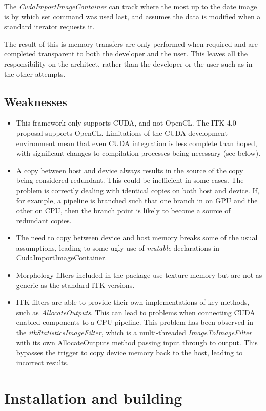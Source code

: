 \documentclass{InsightArticle}
\begin{document}
The {\em CudaImportImageContainer} can track where the most up to the
date image is by which set command was used last, and assumes the data
is modified when a standard iterator requests it.

The result of this is memory transfers are only performed when
required and are completed transparent to both the developer and the
user. This leaves all the responsibility on the architect, rather than
the developer or the user such as in the other attempts.

\subsection{Weaknesses}
\begin{itemize}
\item This framework only supports CUDA, and not OpenCL. The ITK 4.0
proposal supports OpenCL. Limitations of the CUDA development
environment mean that even CUDA integration is less complete than
hoped, with significant changes to compilation processes being
necessary (see below).
\item A copy between host and device always results in the source of
the copy being considered redundant. This could be inefficient in some
cases. The problem is correctly dealing with identical copies on both
host and device. If, for example, a pipeline is branched such that one
branch in on GPU and the other on CPU, then the branch point is likely
to become a source of redundant copies.
\item The need to copy between device and host memory breaks some of
the usual assumptions, leading to some ugly use of {\em mutable}
declarations in CudaImportImageContainer.
\item Morphology filters included in the package use texture memory
but are not as generic as the standard ITK versions.
\item ITK filters are able to provide their own implementations of key
methods, such as {\em AllocateOutputs}. This can lead to problems when
connecting CUDA enabled components to a CPU pipeline. This problem has
been observed in the {\em itkStatisticsImageFilter}, which is a
multi-threaded {\em ImageToImageFilter} with its own AllocateOutputs
method passing input through to output. This bypasses the trigger to
copy device memory back to the host, leading to incorrect results.
\end{itemize}

\section{Installation and building}
\end{document}
